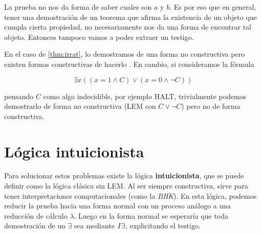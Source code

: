 La prueba no nos da forma de saber cuales son $a$ y $b$. Es por eso que en
general, tener una demostración de un teorema que afirma la existencia de un
objeto que cumpla cierta propiedad, no necesariamente nos da una forma de
encontrar tal objeto. Entonces tampoco vamos a poder extraer un testigo.

En el caso de \ref{thm:irrat}, lo demostramos de una forma no constructiva pero
existen formas constructivas de hacerlo . En cambio, si consideramos
la fórmula

\[
    \exists x ((x = 1 \wedge C) \vee (x = 0 \wedge \neg C))
\]

pensando $C$ como algo indecidible, por ejemplo HALT, trivialmente podemos
demostrarlo de forma no constructiva (LEM con $C \vee \neg C$) pero no de forma constructiva.

\section{Lógica intuicionista}

Para solucionar estos problemas existe la lógica \textbf{intuicionista}, que se
puede definir como la lógica clásica sin LEM. Al ser siempre constructiva, sirve
para tener interpretaciones computacionales (como la \textit{BHK}). En esta
lógica, podemos reducir la prueba hacia una forma normal con un proceso análogo
a una reducción de cálculo $\lambda$. Luego en la forma normal se esperaría que
toda demostración de un $\exists$ sea mediante $I\exists$, explicitando el
testigo.



\cite{miquel-friedman}

\cite{selinger-friedman}